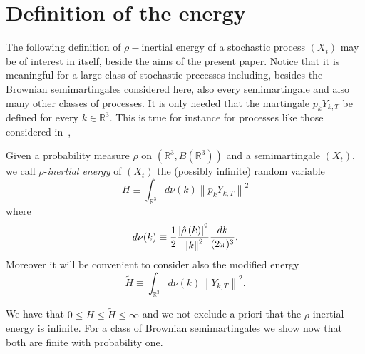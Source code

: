 \section{Definition of the energy}
The following definition of $\rho-$inertial energy of a stochastic
process $(X_t)$ may be of interest in itself, beside the aims of the
present paper. Notice that it is meaningful for a large class of
stochastic precesses including, besides the Brownian semimartingales
considered here, also every semimartingale and also many other classes
of processes. It is only needed that the martingale
$p_k Y_{k,T}$ be defined for every $k \in \mathbb{R}^3$. 
This is true for instance
for processes like those considered in~\cite{Bert},\cite{Zal}

\begin{definition}
\label{def_energy}
Given a probability measure $\rho $ on $( \mathbb{R}^{3},B( 
\mathbb{R}^{3})) $ and a semimartingale $( X_{t}) $,
we call $\rho $-\textit{inertial energy} of $( X_{t}) $ the
(possibly infinite) random variable 
\begin{equation}
H \equiv \int_{\mathbb{R}^3} d\nu(k) \left\|p_k Y_{k,T}\right\|^2
\label{defH}
\end{equation}
where
$$
d\nu(k) \equiv \frac{1}{2} \frac{\left| \hat{\rho}\left( k\right) \right| ^{2}}
{\left\| k\right\|^{2}} \frac{dk}{(2\pi)^3}.
$$
Moreover it will be convenient to consider also the modified energy
\begin{equation}
\tilde{H} \equiv \int_{\mathbb{R}^3} d\nu(k) \left\| Y_{k,T}\right\|^2.
\label{defHtilde}
\end{equation}
\end{definition}
We have that $0 \le H \le \tilde{H} \le \infty$ and we
not exclude a priori that the $\rho $-inertial energy is infinite. For a
class of Brownian semimartingales we show now that both are finite with
probability one.

